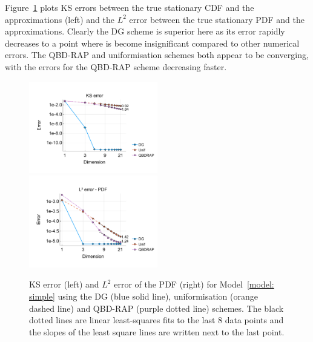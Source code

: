 Figure~\ref{fig: reflecting stationary} plots KS errors between the true stationary CDF and the approximations (left) and the \(L^2\) error between the true stationary PDF and the approximations. Clearly the DG scheme is superior here as its error rapidly decreases to a point where is become insignificant compared to other numerical errors. The QBD-RAP and uniformisation schemes both appear to be converging, with the errors for the QBD-RAP scheme decreasing faster.
\begin{figure}[h]
	\centering
	\includegraphics[width=0.5\textwidth,trim={0.75cm 0.8cm 0.25cm 1.25cm},clip]{chapter6/figs/hitting_times_model/reflecting_model/stationary_distribution/ks_error_formatted.pdf}%
	\includegraphics[width=0.5\textwidth,trim={0.75cm 0.8cm 0.25cm 1.25cm},clip]{chapter6/figs/hitting_times_model/reflecting_model/stationary_distribution/l2_pdf_error_formatted.pdf}
	\caption{KS error (left) and \(L^2\) error of the PDF (right) for Model~\ref{model: simple} using the DG (blue solid line), uniformisation (orange dashed line) and QBD-RAP (purple dotted line) schemes. The black dotted lines are linear least-squares fits to the last 8 data points and the slopes of the least square lines are written next to the last point.} 
	\label{fig: reflecting stationary} 
\end{figure}

\FloatBarrier
